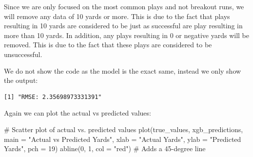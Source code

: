\documentclass[
  super,
  preprint,
  3p]{elsarticle}
\newenvironment{Shaded}{\begin{snugshade}}{\end{snugshade}}
\newcommand{\AttributeTok}[1]{\textcolor[rgb]{0.40,0.45,0.13}{#1}}
\newcommand{\CommentTok}[1]{\textcolor[rgb]{0.37,0.37,0.37}{#1}}
\newcommand{\DecValTok}[1]{\textcolor[rgb]{0.68,0.00,0.00}{#1}}
\newcommand{\FunctionTok}[1]{\textcolor[rgb]{0.28,0.35,0.67}{#1}}
\newcommand{\NormalTok}[1]{\textcolor[rgb]{0.00,0.23,0.31}{#1}}
\newcommand{\OtherTok}[1]{\textcolor[rgb]{0.00,0.23,0.31}{#1}}
\newcommand{\SpecialCharTok}[1]{\textcolor[rgb]{0.37,0.37,0.37}{#1}}
\newcommand{\StringTok}[1]{\textcolor[rgb]{0.13,0.47,0.30}{#1}}
\begin{document}
Since we are only focused on the most common plays and not breakout
runs, we will remove any data of 10 yards or more. This is due to the
fact that plays resulting in 10 yards are considered to be just as
successful are play resulting in more than 10 yards. In addition, any
plays resulting in 0 or negative yards will be removed. This is due to
the fact that these plays are considered to be unsuccessful.

\begin{Shaded}
\end{Shaded}

We do not show the code as the model is the exact same, instead we only
show the output:

\begin{verbatim}
[1] "RMSE: 2.35698973331391"
\end{verbatim}

Again we can plot the actual vs predicted values:

\begin{Shaded}
\begin{Highlighting}[]
\CommentTok{\# Scatter plot of actual vs. predicted values}
\FunctionTok{plot}\NormalTok{(true\_values, xgb\_predictions, }\AttributeTok{main =} \StringTok{"Actual vs Predicted Yards"}\NormalTok{, }\AttributeTok{xlab =} \StringTok{"Actual Yards"}\NormalTok{, }\AttributeTok{ylab =} \StringTok{"Predicted Yards"}\NormalTok{, }\AttributeTok{pch =} \DecValTok{19}\NormalTok{)}
\FunctionTok{abline}\NormalTok{(}\DecValTok{0}\NormalTok{, }\DecValTok{1}\NormalTok{, }\AttributeTok{col =} \StringTok{"red"}\NormalTok{)  }\CommentTok{\# Adds a 45{-}degree line}
\end{Highlighting}
\end{Shaded}
\end{document}

